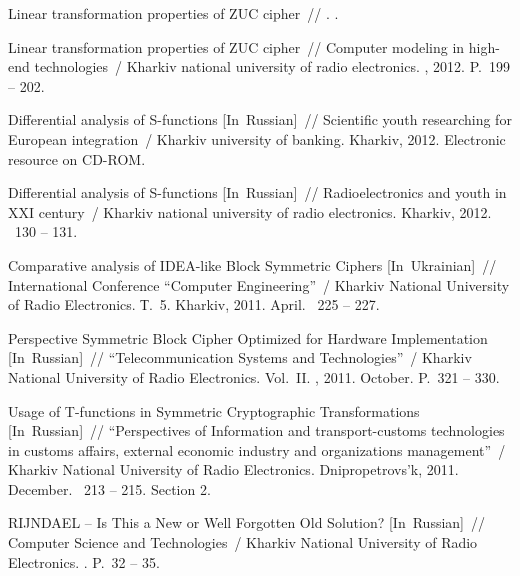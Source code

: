 \begin{appendices}
\begin{thebibliography}{1}
 {Linear transformation properties of
  ZUC cipher}~// . \BibDash
{}. \BibDash
{}

 {Linear transformation
  properties of ZUC cipher}~// {Computer modeling in high-end technologies}~/
  Kharkiv national university of radio electronics. \BibDash
{}, 2012. \BibDash
\newblock P.~199 -- 202.

 {Differential analysis of S-functions
  [In~Russian]}~// {Scientific youth researching for European integration}~/
  Kharkiv university of banking. \BibDash
\newblock Kharkiv, 2012. \BibDash
\newblock Electronic resource on CD-ROM.

 {Differential analysis of S-functions
  [In~Russian]}~// {Radioelectronics and youth in XXI century}~/ Kharkiv
  national university of radio electronics. \BibDash
\newblock Kharkiv, 2012. \BibDash
{}~130 -- 131.

 {Comparative analysis of IDEA-like Block Symmetric
  Ciphers [In~Ukrainian]}~// {International Conference ``Computer
  Engineering''}~/ {Kharkiv National University of Radio Electronics}. \BibDash
\newblock Т.~5. \BibDash
\newblock Kharkiv, 2011. \BibDash April. \BibDash
{}~225 -- 227.

 {Perspective Symmetric Block Cipher
  Optimized for Hardware Implementation [In~Russian]}~// {``Telecommunication
  Systems and Technologies''}~/ {Kharkiv National University of Radio
  Electronics}. \BibDash
\newblock Vol.~II. \BibDash
{}, 2011. \BibDash October. \BibDash
\newblock P.~321 -- 330.

 {Usage of T-functions in Symmetric
  Cryptographic Transformations [In~Russian]}~// {``Perspectives of Information
  and transport-customs technologies in customs affairs, external economic
  industry and organizations management''}~/ {Kharkiv National University of
  Radio Electronics}. \BibDash
\newblock Dnipropetrovs'k, 2011. \BibDash December. \BibDash
{}~213 -- 215. \BibDash
\newblock Section 2.

 {RIJNDAEL -- Is This a
  New or Well Forgotten Old Solution? [In~Russian]}~// {Computer Science and
  Technologies}~/ {Kharkiv National University of Radio Electronics}. \BibDash
{}. \BibDash
\newblock P.~32 -- 35.

\end{thebibliography}
\endgroup

\end{appendices}

